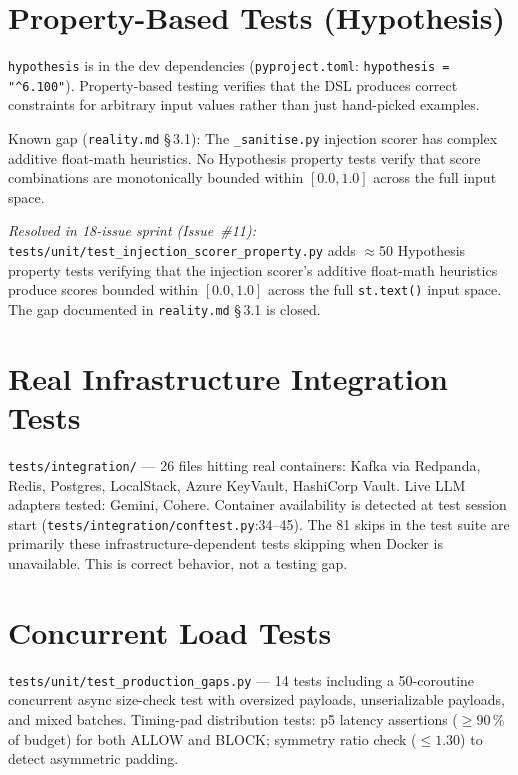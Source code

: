 \documentclass[12pt,a4paper,oneside]{report}
\newcommand{\fname}[1]{\texttt{#1}}          %
\newcommand{\code}[1]{\texttt{#1}}           %
\newcommand{\cfrsec}[1]{\S\,#1}             %
\begin{document}
\section{Property-Based Tests (Hypothesis)}

\code{hypothesis} is in the dev dependencies (\fname{pyproject.toml}:
\code{hypothesis = "\^{}6.100"}). Property-based testing verifies that the
DSL produces correct constraints for arbitrary input values rather than just
hand-picked examples.

Known gap (\fname{reality.md} \cfrsec{3.1}): The \fname{\_sanitise.py}
injection scorer has complex additive float-math heuristics. No Hypothesis
property tests verify that score combinations are monotonically bounded within
$[0.0, 1.0]$ across the full input space.

\textit{Resolved in 18-issue sprint (Issue~\#11):}
\fname{tests/unit/test\_injection\_scorer\_property.py} adds $\approx$50
Hypothesis property tests verifying that the injection scorer's additive
float-math heuristics produce scores bounded within $[0.0, 1.0]$ across the
full \code{st.text()} input space.  The gap documented in \fname{reality.md}
\cfrsec{3.1} is closed.

\section{Real Infrastructure Integration Tests}

\fname{tests/integration/} --- 26 files hitting real containers: Kafka via
Redpanda, Redis, Postgres, LocalStack, Azure KeyVault, HashiCorp Vault. Live
LLM adapters tested: Gemini, Cohere. Container availability is detected at
test session start (\fname{tests/integration/conftest.py}:34--45). The 81
skips in the test suite are primarily these infrastructure-dependent tests
skipping when Docker is unavailable. This is correct behavior, not a testing
gap.

\section{Concurrent Load Tests}

\fname{tests/unit/test\_production\_gaps.py} --- 14 tests including a
50-coroutine concurrent async size-check test with oversized payloads,
unserializable payloads, and mixed batches. Timing-pad distribution tests:
p5 latency assertions ($\geq 90$\,\% of budget) for both ALLOW and BLOCK;
symmetry ratio check ($\leq 1.30$) to detect asymmetric padding.
\end{document}
